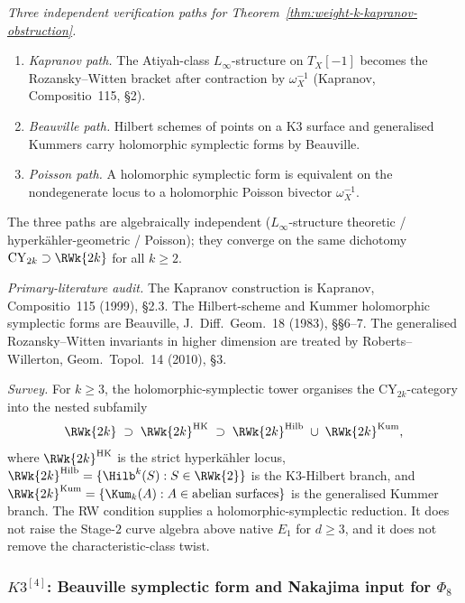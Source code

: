 \noindent\emph{Three independent verification paths for
Theorem~\ref{thm:weight-k-kapranov-obstruction}.}
\begin{enumerate}[label=\textup{(}V\arabic*\textup{)}]
 \item \emph{Kapranov path.} The Atiyah-class \(L_\infty\)-structure on
 \(T_X[-1]\) becomes the Rozansky--Witten bracket after contraction by
 \(\omega_X^{-1}\) \textup{(}Kapranov, Compositio~115, \S 2\textup{)}.
 \item \emph{Beauville path.} Hilbert schemes of points on a K3 surface and
 generalised Kummers carry holomorphic symplectic forms by Beauville.
 \item \emph{Poisson path.} A holomorphic symplectic form is equivalent on
 the nondegenerate locus to a holomorphic Poisson bivector
 \(\omega_X^{-1}\).
\end{enumerate}
The three paths are algebraically independent
\textup{(}$L_\infty$-structure theoretic / hyperk\"ahler-geometric /
Poisson\textup{);} they converge on the same dichotomy
$\mathrm{CY}_{2k} \supset \RWk{2k}$ for all $k \ge 2$.

\emph{Primary-literature audit.} The Kapranov construction is Kapranov,
Compositio~115 \textup{(}1999\textup{)}, \S 2.3. The Hilbert-scheme and
Kummer holomorphic symplectic forms are Beauville, J.\ Diff.\ Geom.~18
\textup{(}1983\textup{)}, \S\S 6--7. The generalised Rozansky--Witten
invariants in higher dimension are treated by Roberts--Willerton,
Geom.\ Topol.~14 \textup{(}2010\textup{)}, \S 3.

\emph{Survey.} For \(k\ge3\), the holomorphic-symplectic tower organises
the $\mathrm{CY}_{2k}$-category into the nested subfamily
\[
 \RWk{2k} \;\supset\; \RWk{2k}^{\mathrm{HK}} \;\supset\;
 \RWk{2k}^{\mathrm{Hilb}} \;\cup\; \RWk{2k}^{\mathrm{Kum}},
\]
where $\RWk{2k}^{\mathrm{HK}}$ is the strict hyperk\"ahler locus,
$\RWk{2k}^{\mathrm{Hilb}} = \{\Hilb^k(S) : S \in \RWk{2}\}$ is the
K$3$-Hilbert branch, and $\RWk{2k}^{\mathrm{Kum}} = \{\Kum_k(A) :
A \in \text{abelian surfaces}\}$ is the generalised Kummer branch.
The RW condition supplies a holomorphic-symplectic reduction. It does not
raise the Stage-$2$ curve algebra above native \(E_1\) for \(d\ge3\), and
it does not remove the characteristic-class twist.

\subsubsection{\texorpdfstring{$K3^{[4]}$}{K3-[4]}: Beauville symplectic form and Nakajima input for
\texorpdfstring{$\Phi_8$}{Phi-8}}
\label{subsubsec:phi-8-hilb4-k3-explicit}

